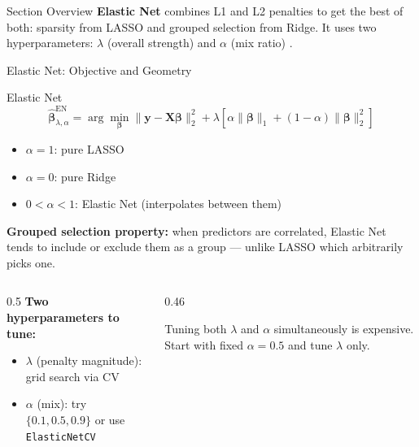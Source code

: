 \documentclass[aspectratio=169, 10pt]{beamer}
\begin{document}

\begin{frame}{Section Overview}
  \textbf{Elastic Net} combines L1 and L2 penalties to get the best of both:
  sparsity from LASSO and grouped selection from Ridge. It uses two
  hyperparameters: $\lambda$ (overall strength) and $\alpha$ (mix ratio)
  \parencite{ZouHastie2005}.

  \smallskip
\end{frame}

\begin{frame}{Elastic Net: Objective and Geometry}
  \begin{definitionbox}{Elastic Net}
    \[
      \hat{\bm{\beta}}^{\mathrm{EN}}_{\lambda,\alpha}
      = \arg\min_{\bm{\beta}} \|\mathbf{y} - \mathbf{X}\bm{\beta}\|_2^2
        + \lambda \left[\alpha \|\bm{\beta}\|_1
          + (1-\alpha)\|\bm{\beta}\|_2^2\right]
    \]
    \begin{itemize}
      \item $\alpha = 1$: pure LASSO
      \item $\alpha = 0$: pure Ridge
      \item $0 < \alpha < 1$: Elastic Net (interpolates between them)
    \end{itemize}
  \end{definitionbox}

  \medskip
  \textbf{Grouped selection property:} when predictors are correlated,
  Elastic Net tends to include or exclude them as a group — unlike LASSO
  which arbitrarily picks one.

  \medskip
  \begin{columns}[T]
    \begin{column}{0.5\textwidth}
      \textbf{Two hyperparameters to tune:}
      \begin{itemize}
        \item $\lambda$ (penalty magnitude): grid search via CV
        \item $\alpha$ (mix): try $\{0.1, 0.5, 0.9\}$ or use \texttt{ElasticNetCV}
      \end{itemize}
    \end{column}
    \begin{column}{0.46\textwidth}
      \begin{warningbox}
        Tuning both $\lambda$ and $\alpha$ simultaneously is expensive.
        Start with fixed $\alpha=0.5$ and tune $\lambda$ only.
      \end{warningbox}
    \end{column}
  \end{columns}
\end{frame}
\end{document}
